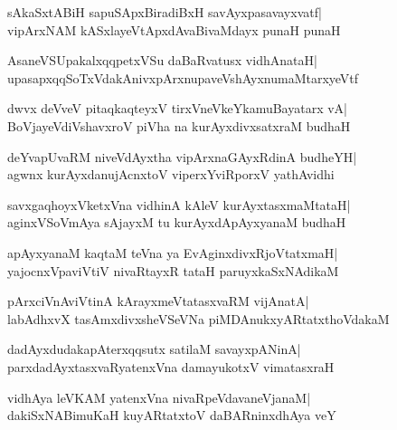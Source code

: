 \documentclass[twoside,12pt,openright]{book}
\newcounter{shloka}[chapter]
\begin{document}
\begin{shloka}%
sAkaSxtABiH sapuSApxBiradiBxH savAyxpasavayxvatf|\\
vipArxNAM kASxlayeVtApxdAvaBivaMdayx punaH punaH
\end{shloka}

\begin{shloka}%
AsaneVSUpakalxqqpetxVSu daBaRvatusx vidhAnataH|\\
upasapxqqSoTxVdakAnivxpArxnupaveVshAyxnumaMtarxyeVtf
\end{shloka}

\begin{shloka}%
dwvx deVveV pitaqkaqteyxV tirxVneVkeYkamuBayatarx vA|\\
BoVjayeVdiVshavxroV piVha na kurAyxdivxsatxraM budhaH
\end{shloka}

\begin{shloka}%
deYvapUvaRM niveVdAyxtha vipArxnaGAyxRdinA budheYH|\\
agwnx kurAyxdanujAcnxtoV viperxYviRporxV yathAvidhi
\end{shloka}

\begin{shloka}%
savxgaqhoyxVketxVna vidhinA kAleV kurAyxtasxmaMtataH|\\
aginxVSoVmAya sAjayxM tu kurAyxdApAyxyanaM budhaH 
\end{shloka}

\begin{shloka}%
apAyxyanaM kaqtaM teVna ya EvAginxdivxRjoVtatxmaH|\\
yajocnxVpaviVtiV nivaRtayxR tataH paruyxkaSxNAdikaM
\end{shloka}

\begin{shloka}%
pArxciVnAviVtinA kArayxmeVtatasxvaRM vijAnatA|\\
labAdhxvX tasAmxdivxsheVSeVNa piMDAnukxyARtatxthoVdakaM
\end{shloka}

\begin{shloka}%
dadAyxdudakapAterxqqsutx satilaM savayxpANinA|\\
parxdadAyxtasxvaRyatenxVna damayukotxV vimatasxraH
\end{shloka}

\begin{shloka}%
vidhAya leVKAM yatenxVna nivaRpeVdavaneVjanaM|\\
dakiSxNABimuKaH kuyARtatxtoV daBARninxdhAya veY
\end{shloka}
\end{document}
